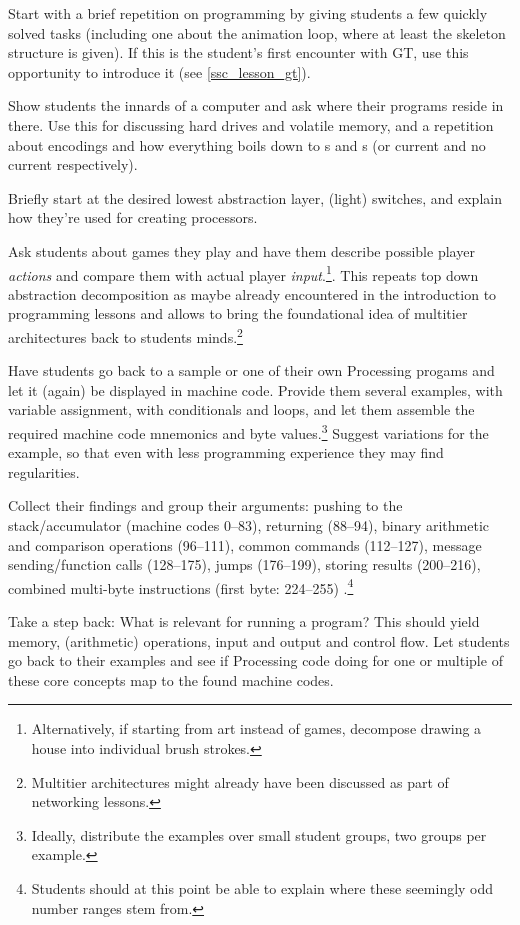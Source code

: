 \begin{instructions}
\item Start with a brief repetition on programming by giving students a few quickly solved tasks (including one about the animation loop, where at least the skeleton structure is given). If this is the student's first encounter with \ac{GT}, use this opportunity to introduce it (see \ref{ssc_lesson_gt}).
\item Show students the innards of a computer and ask where their programs reside in there. Use this for discussing hard drives and volatile memory, and a repetition about encodings and how everything boils down to s and s (or current and no current respectively).
\item Briefly start at the desired lowest abstraction layer, \eg (light) switches, and explain how they're used for creating processors.
\item Ask students about games they play and have them describe possible player \emph{actions} and compare them with actual player \emph{input}.\footnote{Alternatively, if starting from art instead of games, decompose drawing \eg a house into individual brush strokes.}. This repeats top down abstraction decomposition as maybe already encountered in the introduction to programming lessons and allows to bring the foundational idea of multitier architectures back to students minds.\footnote{Multitier architectures might already have been discussed as part of networking lessons.}
\item Have students go back to a sample or one of their own Processing progams and let it (again) be displayed in machine code. Provide them several examples, \eg with variable assignment, with conditionals and loops, and let them assemble the required machine code mnemonics and byte values.\footnote{Ideally, distribute the examples over small student groups, two groups per example.} Suggest variations for the example, so that even with less programming experience they may find regularities.
\item Collect their findings and group their arguments: pushing to the stack/accumulator (machine codes 0--83), returning (88--94), binary arithmetic and comparison operations (96--111), common commands (112--127), message sending/function calls (128--175), jumps (176--199), storing results (200--216), combined multi-byte instructions (first byte: 224--255) \cite[p.\,12]{Ber14}.\footnote{Students should at this point be able to explain where these seemingly odd number ranges stem from.}
\item Take a step back: What is relevant for running a program? This should yield memory, (arithmetic) operations, input and output and control flow. Let students go back to their examples and see if Processing code doing for one or multiple of these core concepts map to the found machine codes.

\end{instructions}

